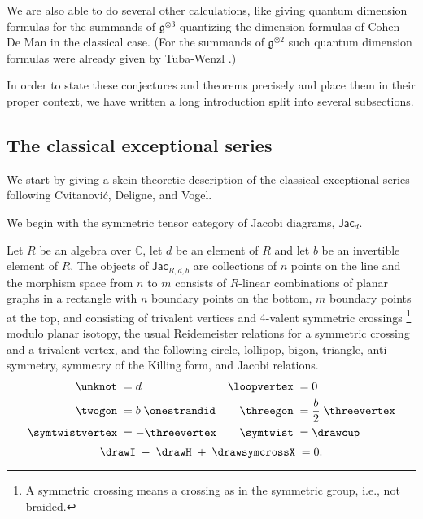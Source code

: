 \documentclass[12pt]{amsart}
\begin{document}
We are also able to do several other calculations, like giving quantum
dimension formulas for the summands of $\mathfrak{g}^{\otimes 3}$ quantizing
the dimension formulas of Cohen--De Man \cite{MR1381778} in the classical case.
(For the summands of $\mathfrak{g}^{\otimes 2}$ such quantum dimension
formulas were already given by Tuba-Wenzl \cite{MR2132671}.)

In order to state these conjectures and theorems precisely and place them in
their proper context, we have written a  long introduction split into several
subsections.

\subsection{The classical exceptional series}
\label{sec:intro-classical}
We start by giving a skein theoretic
description of the classical exceptional series following Cvitanović, Deligne,
and Vogel.

We begin with the symmetric tensor category of Jacobi
diagrams, $\mathsf{Jac}_d$.

\begin{definition}
Let $R$ be an algebra over $\mathbb{C}$, let $d$ be an element of $R$
and let
$b$ be an invertible element of $R$.  The objects of $\mathsf{Jac}_{R,d,b}$ are
collections of $n$ points on the line and the morphism space from $n$ to $m$
consists of $R$-linear combinations of planar graphs in a rectangle with $n$
boundary points on the bottom, $m$ boundary points at the top, and consisting
of trivalent vertices and $4$-valent symmetric crossings%
\footnote{A symmetric crossing means a crossing as in the symmetric
  group, i.e., not braided.}
modulo planar isotopy, the usual Reidemeister relations
for a symmetric crossing and a trivalent vertex, and the following
circle, lollipop, bigon,
triangle, anti-symmetry, symmetry of the Killing form, and Jacobi relations.
\begin{align}
\label{eq:classical-loop-lollipop}  \unknot \; &= d &  \loopvertex \; &=0 \\
\label{eq:classical-bigon-trigon}  \twogon\; &= b \;\onestrandid  & \threegon\; &= \frac{b}{2} \;\threevertex \\
\label{eq:classical-symmetry-antisymmetry}   \symtwistvertex\; &= - \threevertex & \symtwist\; &= \drawcup
\end{align}
\begin{equation}
\drawI\; - \;\drawH\; + \;\drawsymcrossX\; = 0.
\label{eq:IHX}
\end{equation}
\end{definition}
\end{document}
